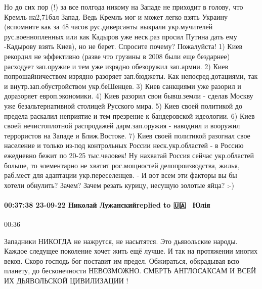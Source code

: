 Но до сих пор (!) за все полгода никому на Западе не приходит в голову, что Кремль на2,71бал Запад.
Ведь Кремль мог и может легко взять Украину (вспомните как за 48 часов рус.диверсанты выкрали укр.мучителей рус.военнопленных или как Кадыров уже неск.раз просил Путина дать ему -Кадырову взять Киев), но не берет. Спросите почему? Пожалуйста!
1) Киев рекорднл не эффективно (разве что грузины в 2008 были еще бездарнее) расходует зап.оружие и тем уже изрядно обезоружил зап.армии.
2) Киев попрошайничеством изрядно разоряет зап.бюджеты. Как непосред.дотациями, так и внутр.зап.обустройством укр.беШенцев.
3) Киев санкциями уже разорил и доразоряет европ.экономики.
4) Киев разорил свои бывш.земли - сделав Москву уже безальтернативной столицей Русского мира.
5) Киев своей политикой до предела раскалил неприятие и тем презрение к бандеровской идеологии.
6) Киев своей нечистоплотной распродажей дарм.зап.оружия - наводнил и вооружил террористов на Западе и Ближ.Востоке.
7) Киев своей политикой разогнал свое население и только из-под контрольных России неск.укр.областей - в Россию ежедневно бежит по 20-25 тыс.человек! Ну нахватай Россия сейчас укр.областей больше, то элементарно не хватит рос.мощностей делопроизводства, жилья, раб.мест для адаптации укр.переселенцев.
-
И вот всем эти факторы вы бы хотели обнулить? Зачем? Зачем резать курицу, несущую золотые яйца? :-)

\paragraph{00:37:38 23-09-22 Николай Лужанскийreplied to 🇺🇦💙💛 Юлія}
00:36


Западники
НИКОГДА не нажрутся, не насытятся. Это
дьявольские народы. Каждое следущее
поколение хочет жить ещё лучше. И так
на протяжении многих веков. Скоро господь
бог поставит им предел. Обжираться,
обкрадывая всю планету, до бесконечности
НЕВОЗМОЖНО. СМЕРТЬ АНГЛОСАКСАМ И
ВСЕЙ ИХ ДЬЯВОЛЬСКОЙ ЦИВИЛИЗАЦИИ !


